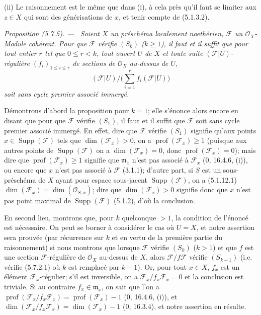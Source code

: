 \documentclass[10pt,oneside]{book}
\newcommand{\oldpage}[2][]{%
  \setcounter{footnote}{0}%
  \marginpar{\scriptsize\textbf{#1}~|~#2}\ignorespaces}
\newenvironment{proposition}[1][]{%
  \par\medskip\noindent\itshape Proposition (#1). ---\ }{\par}
\begin{document}
\oldpage[IV-2]{105}

(ii) Le raisonnement est le même que dans (i), à cela près qu'il faut se
limiter aux $z\in X$ qui sont des générisations de $x$, et tenir compte de
(5.1.3.2).

\begin{proposition}[5.7.5]
\label{IV.2.s5.7.5-fr}
Soient $X$ un préschéma localement noethérien, $\mathscr F$ un
$\mathcal O_X$-Module cohérent. Pour que $\mathscr F$ vérifie $(S_k)$
($k\geq1$), il faut et il suffit que pour tout entier $r$ tel que
$0\leq r<k$, tout ouvert $U$ de $X$ et toute suite
$(\mathscr F|U)$-régulière $(f_i)_{1\leq i\leq r}$ de sections de
$\mathcal O_X$ au-dessus de $U$,
\[
(\mathscr F|U)\big/\Big(\sum_{i=1}^r f_i(\mathscr F|U)\Big)
\]
soit sans cycle premier associé immergé.
\end{proposition}

Démontrons d'abord la proposition pour $k=1$; elle s'énonce alors encore en
disant que pour que $\mathscr F$ vérifie $(S_1)$, il faut et il suffit que
$\mathscr F$ soit sans cycle premier associé immergé. En effet, dire que
$\mathscr F$ vérifie $(S_1)$ signifie qu'aux points
$x\in\operatorname{Supp}(\mathscr F)$ tels que $\dim(\mathscr F_x)>0$, on a
$\operatorname{prof}(\mathscr F_x)\geq1$ (puisque aux autres points de
$\operatorname{Supp}(\mathscr F)$ on a $\dim(\mathscr F_x)=0$, donc
$\operatorname{prof}(\mathscr F_x)=0$); mais dire que
$\operatorname{prof}(\mathscr F_x)\geq1$ signifie que $\mathfrak m_x$
n'est pas associé à $\mathscr F_x$ (0, 16.4.6, (i)), ou encore que $x$
n'est pas associé à $\mathscr F$ (3.1.1); d'autre part, si $S$ est un
sous-préschéma de $X$ ayant pour espace sous-jacent
$\operatorname{Supp}(\mathscr F)$, on a (5.1.12.1)
$\dim(\mathscr F_x)=\dim(\mathcal O_{S,x})$; dire que
$\dim(\mathscr F_x)>0$ signifie donc que $x$ n'est pas point maximal de
$\operatorname{Supp}(\mathscr F)$ (5.1.2), d'où la conclusion.

En second lieu, montrons que, pour $k$ quelconque $>1$, la condition de
l'énoncé est nécessaire. On peut se borner à considérer le cas où $U=X$,
et notre assertion sera prouvée (par récurrence sur $k$ et en vertu de la
première partie du raisonnement) si nous montrons que lorsque $\mathscr F$
vérifie $(S_k)$ ($k>1$) et que $f$ est une section $\mathscr F$-régulière
de $\mathcal O_X$ au-dessus de $X$, alors $\mathscr F/f\mathscr F$ vérifie
$(S_{k-1})$ (i.e. vérifie (5.7.2.1) où $k$ est remplacé par $k-1$). Or,
pour tout $x\in X$, $f_x$ est un élément $\mathscr F_x$-régulier; s'il est
inversible, on a $\mathscr F_x/f_x\mathscr F_x=0$ et la conclusion est
triviale. Si au contraire $f_x\in\mathfrak m_x$, on sait que l'on a
$\operatorname{prof}(\mathscr F_x/f_x\mathscr F_x)
=\operatorname{prof}(\mathscr F_x)-1$ (0, 16.4.6, (i)), et
$\dim(\mathscr F_x/f_x\mathscr F_x)=\dim(\mathscr F_x)-1$ (0, 16.3.4), et
notre assertion en résulte.
\end{document}
